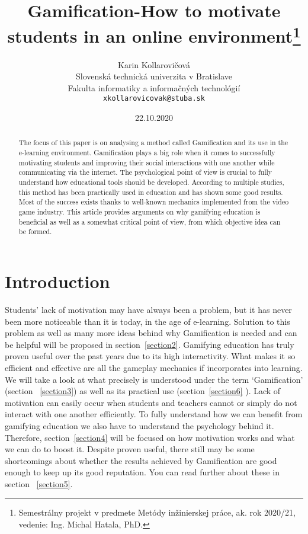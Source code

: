\documentclass[10pt,twoside,english,a4paper]{article}
\title{Gamification-How to motivate students in an online environment\thanks{Semestrálny projekt v predmete Metódy inžinierskej práce, ak. rok 2020/21, vedenie: Ing. Michal Hatala, PhD.}}
\author{Karin Kollarovičová\\[2pt]
	{\small Slovenská technická univerzita v Bratislave}\\
	{\small Fakulta informatiky a informačných technológií}\\
	{\small \texttt{xkollarovicovak@stuba.sk}}
	}
\date{\small 22.10.2020}
\begin{document}
\maketitle

\begin{abstract}
	The focus of this paper is on analysing a method called Gamification and its use in the e-learning environment. 
	Gamification plays a big role when it comes to successfully motivating students and improving their social interactions with one another while communicating via the internet. 
	The psychological point of view is crucial to fully understand how educational tools should be developed. 
	According to multiple studies, this method has been practically used in education and has shown some good results. 
	Most of the success exists thanks to well-known mechanics implemented from the video game industry. 
	This article provides arguments on why gamifying education is beneficial as well as a somewhat critical point of view, from which objective idea can be formed. 
\end{abstract}



\section{Introduction} \label{introduction}
Students’ lack of motivation may have always been a problem, but it has never been more noticeable than it is today, in the age of e-learning. 
Solution to this problem as well as many more ideas behind why Gamification is needed and can be helpful will be proposed in section~\ref{section2}. 
Gamifying education has truly proven useful over the past years due to its high interactivity. What makes it so efficient and effective are all the gameplay mechanics if incorporates into learning.
We will take a look at what precisely is understood under the term ‘Gamification’ (section ~\ref{section3}) as well as its practical use (section~\ref{section6} ).
Lack of motivation can easily occur when students and teachers cannot or simply do not interact with one another efficiently. To fully understand how we can benefit from gamifying education we also have to understand the psychology behind it.
Therefore, section~\ref{section4} will be focused on how motivation works and what we can do to boost it. Despite proven useful, there still may be some shortcomings about whether the results achieved by Gamification are good enough to keep up its good reputation. You can read further about these in section ~\ref{section5}.
\end{document}
